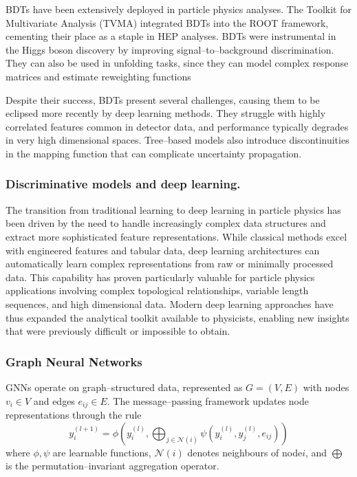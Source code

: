             BDTs have been extensively deployed in particle physics analyses.
            The Toolkit for Multivariate Analysis (TVMA) integrated BDTs into the ROOT framework, cementing their place as a staple in HEP analyses.
            BDTs were instrumental in the Higgs boson discovery by improving signal--to--background discrimination.
            They can also be used in unfolding tasks, since they can model complex response matrices and estimate reweighting functions
            
            Despite their success, BDTs present several challenges, causing them to be eclipsed more recently by deep learning methods.
            They struggle with highly correlated features common in detector data, and performance typically degrades in very high dimensional spaces.
            Tree--based models also introduce discontinuities in the mapping function that can complicate uncertainty propagation.
        \subsubsection{Discriminative models and deep learning.}
            The transition from traditional learning to deep learning in particle physics has been driven by the need to handle increasingly complex data structures and extract more sophisticated feature representations.
            While classical methods excel with engineered features and tabular data, deep learning architectures can automatically learn complex representations from raw or minimally processed data.
            This capability has proven particularly valuable for particle physics applications involving complex topological relationships, variable length sequences, and high dimensional data.
            Modern deep learning approaches have thus expanded the analytical toolkit available to physicists, enabling new insights that were previously difficult or impossible to obtain.
            \subsubsection{Graph Neural Networks}
                GNNs operate on graph--structured data, represented as \(G = (V, E)\)
                with nodes \(v_i \in V\) and edges \(e_{ij} \in E\).
                The message--passing framework updates node representations through the rule
                \begin{equation}
                    y_i^{(l+1)} = \phi\left(y_i^{(l)}, \bigoplus_{j \in \mathcal{N}(i)} \psi(y_i^{(l)}, y_j^{(l)}, e_{ij})\right)
                \end{equation}
                where \(\phi, \psi\) are learnable functions, \(\mathcal{N}(i)\) denotes neighbours of node\(i\), and \(\bigoplus\) is the permutation--invariant aggregation operator.
        
